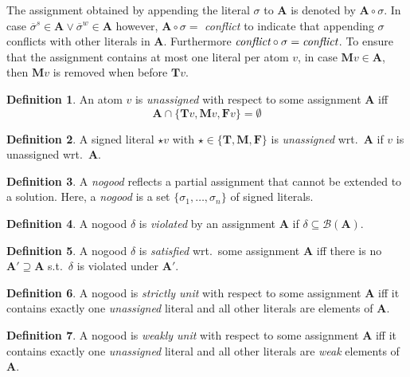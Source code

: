 \documentclass{vutinfth} %
\theoremstyle{example}
\theoremstyle{definition}
\newtheorem{definition}{Definition}[section]
\theoremstyle{theorem}
\theoremstyle{lemma}
\theoremstyle{corollary}
\newcommand{\negstrong}[1]{\overline{#1}^s}
\newcommand{\negweak}[1]{\overline{#1}^w}
\newcommand{\bass}{\mathcal{B}}
\newcommand{\ass}{\mathbf{A}}
\newcommand{\bT}{\mathbf{T}}
\newcommand{\bM}{\mathbf{M}}
\newcommand{\bF}{\mathbf{F}}
\newcommand{\thrice}{{\{\bT, \bM, \bF \}}}
\begin{document}
The assignment obtained by appending the literal $\sigma$ to $\ass$ is denoted by $\ass \circ \sigma$. In case $\negstrong{\sigma} \in \ass \vee \negweak{\sigma} \in \ass$ however, $\ass \circ \sigma =$ \emph{conflict} to indicate that appending $\sigma$ conflicts with other literals in $\ass$. Furthermore $\emph{conflict} \circ \sigma = \emph{conflict}$. To ensure that the assignment contains at most one literal per atom $v$, in case $\mathbf{M}v \in \ass$, then $\mathbf{M}v$ is removed when before $\mathbf{T}v$.

\begin{definition}
An atom $v$ is \emph{unassigned} with respect to some assignment $\ass$ iff $$\ass \cap \{\bT v, \bM v, \bF v \} = \emptyset$$
\end{definition}

\begin{definition}
A signed literal $\star v$ with $\star \in \thrice$ is \emph{unassigned} wrt.~$\ass$ if $v$ is unassigned wrt.~$\ass$.
\end{definition}

\begin{definition}
A \emph{nogood} reflects a partial assignment that cannot be extended to a solution. Here, a \emph{nogood} is a set $\{ \sigma_1, \ldots, \sigma_n \}$ of signed literals.
\end{definition}

\begin{definition}
A nogood $\delta$ is \emph{violated} by an assignment $\mathbf{A}$ if $\delta \subseteq \bass(\ass)$.
\end{definition}

\begin{definition}
A nogood $\delta$ is \emph{satisfied} wrt.~some assignment $\ass$ iff there is no $\ass' \supseteq \ass$ s.t.~$\delta$ is violated under $\ass'$.
\end{definition}

\begin{definition}
A nogood is \emph{strictly unit} with respect to some assignment $\mathbf{A}$ iff it contains exactly one \emph{unassigned} literal and all other literals are elements of $\mathbf{A}$.
\end{definition}

\begin{definition}
A nogood is \emph{weakly unit} with respect to some assignment $\mathbf{A}$ iff it contains exactly one \emph{unassigned} literal and all other literals are \emph{weak} elements of $\mathbf{A}$.
\end{definition}
\end{document}
